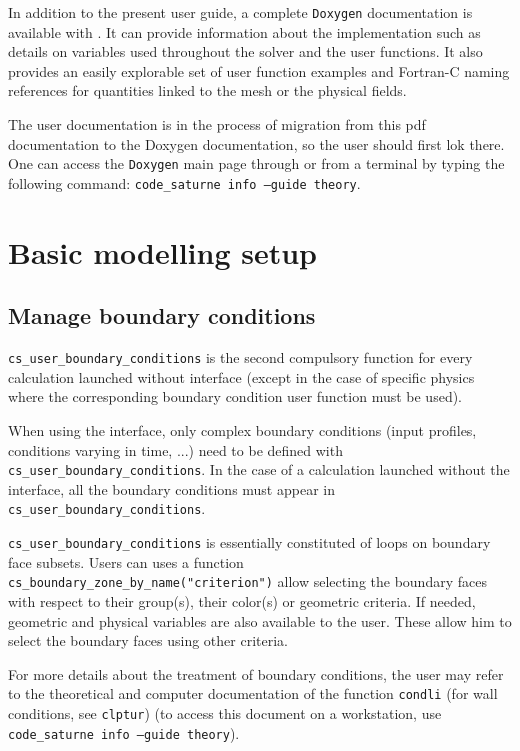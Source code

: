 In addition to the present user guide, a complete
\texttt{Doxygen} documentation is available with \CS. It can provide
information about the implementation such as details on variables used
throughout the solver and the user functions. It also provides an easily
explorable set of user function examples and Fortran-C naming references for
quantities linked to the mesh or the physical fields.

The user documentation is in the process of migration from this pdf documentation
to the Doxygen documentation, so the user should first lok there.
One can access the \texttt{Doxygen} main page through  or from a terminal by typing the following command:
\texttt{code\_saturne info --guide theory}.

\section{Basic modelling setup}

\subsection{Manage boundary conditions}

\texttt{cs\_user\_boundary\_conditions} is the second compulsory function for every calculation launched
without interface (except in the case of specific physics where the
corresponding boundary condition user function must be used).

When using the interface, only complex boundary conditions (input profiles, conditions varying in time, ...)
need to be defined with \texttt{cs\_user\_boundary\_conditions}.
In the case of a calculation launched without the
interface, all the boundary conditions must appear in \texttt{cs\_user\_boundary\_conditions}.

\texttt{cs\_user\_boundary\_conditions} is essentially constituted of loops on boundary
face subsets. Users can uses a function \texttt{cs\_boundary\_zone\_by\_name("criterion")}
allow selecting the boundary faces with respect to their group(s), their
color(s) or geometric criteria. If needed, geometric and
physical variables are also available to the user. These allow him
to select the boundary faces using other criteria.

For more details about the treatment of boundary conditions, the user
may refer to the theoretical and computer documentation \cite{theory} of
the function \texttt{condli} (for wall conditions, see
\texttt{clptur}) (to access this document on a workstation, use
\mbox{\texttt{code\_saturne~info --guide theory}}).

